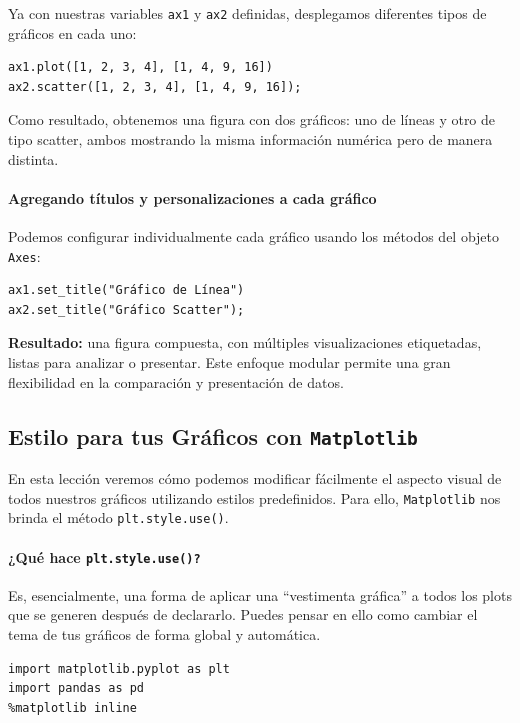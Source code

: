\documentclass{article}
\theoremstyle{nonumberplain}
\begin{document}
Ya con nuestras variables \texttt{ax1} y \texttt{ax2} definidas, desplegamos diferentes tipos de gráficos en cada uno:

\begin{verbatim}
ax1.plot([1, 2, 3, 4], [1, 4, 9, 16])
ax2.scatter([1, 2, 3, 4], [1, 4, 9, 16]);
\end{verbatim}

Como resultado, obtenemos una figura con dos gráficos: uno de líneas y otro de tipo scatter, ambos mostrando la misma información numérica pero de manera distinta.

\paragraph{Agregando títulos y personalizaciones a cada gráfico}

Podemos configurar individualmente cada gráfico usando los métodos del objeto \texttt{Axes}:

\begin{verbatim}
ax1.set_title("Gráfico de Línea")
ax2.set_title("Gráfico Scatter");
\end{verbatim}

\textbf{Resultado:} una figura compuesta, con múltiples visualizaciones etiquetadas, listas para analizar o presentar. Este enfoque modular permite una gran flexibilidad en la comparación y presentación de datos.

\vspace{1em}

\subsection*{Estilo para tus Gráficos con \texttt{Matplotlib}}

En esta lección veremos cómo podemos modificar fácilmente el aspecto visual de todos nuestros gráficos utilizando estilos predefinidos. Para ello, \texttt{Matplotlib} nos brinda el método \texttt{plt.style.use()}.

\paragraph{¿Qué hace \texttt{plt.style.use()?}}

Es, esencialmente, una forma de aplicar una “vestimenta gráfica” a todos los plots que se generen después de declararlo. Puedes pensar en ello como cambiar el tema de tus gráficos de forma global y automática.

\begin{verbatim}
import matplotlib.pyplot as plt
import pandas as pd
%matplotlib inline
\end{verbatim}
\end{document}
